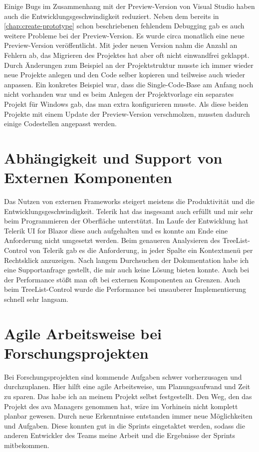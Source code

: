 Einige Bugs im Zusammenhang mit der Preview-Version von Visual Studio haben auch die Entwicklungsgeschwindigkeit reduziert. Neben dem bereits in \autoref{chap:create-prototype} schon beschriebenen fehlendem Debugging gab es auch weitere Probleme bei der Preview-Version. Es wurde circa monatlich eine neue Preview-Version veröffentlicht. Mit jeder neuen Version nahm die Anzahl an Fehlern ab, das Migrieren des Projektes hat aber oft nicht einwandfrei geklappt. Durch Änderungen zum Beispiel an der Projektstruktur musste ich immer wieder neue Projekte anlegen und den Code selber kopieren und teilweise auch wieder anpassen. Ein konkretes Beispiel war, dass die Single-Code-Base am Anfang noch nicht vorhanden war und es beim Anlegen der Projektvorlage ein separates Projekt für Windows gab, das man extra konfigurieren musste. Als diese beiden Projekte mit einem Update der Preview-Version verschmolzen, mussten dadurch einige Codestellen angepasst werden.

\section{Abhängigkeit und Support von Externen Komponenten}
\label{chap:external-components}

Das Nutzen von externen Frameworks steigert meistens die Produktivität und die Entwicklungsgeschwindigkeit. Telerik hat das insgesamt auch erfüllt und mir sehr beim Programmieren der Oberfläche unterstützt. Im Laufe der Entwicklung hat Telerik UI for Blazor diese auch aufgehalten und es konnte am Ende eine Anforderung nicht umgesetzt werden. Beim genaueren Analysieren des TreeList-Control von Telerik gab es die Anforderung, in jeder Spalte ein Kontextmenü per Rechtsklick anzuzeigen. Nach langem Durchsuchen der Dokumentation habe ich eine Supportanfrage gestellt, die mir auch keine Lösung bieten konnte.
Auch bei der Performance stößt man oft bei externen Komponenten an Grenzen. Auch beim TreeList-Control wurde die Performance bei unsauberer Implementierung schnell sehr langsam.

\section{Agile Arbeitsweise bei Forschungsprojekten}
Bei Forschungsprojekten sind kommende Aufgaben schwer vorherzusagen und durchzuplanen. Hier hilft eine agile Arbeitsweise, um Planungsaufwand und Zeit zu sparen. Das habe ich an meinem Projekt selbst festgestellt. Den Weg, den das Projekt des \ac{ava} Managers genommen hat, wäre im Vorhinein nicht komplett planbar gewesen. Durch neue Erkenntnisse entstanden immer neue Möglichkeiten und Aufgaben. Diese konnten gut in die Sprints eingetaktet werden, sodass die anderen Entwickler des Teams meine Arbeit und die Ergebnisse der Sprints mitbekommen. 

